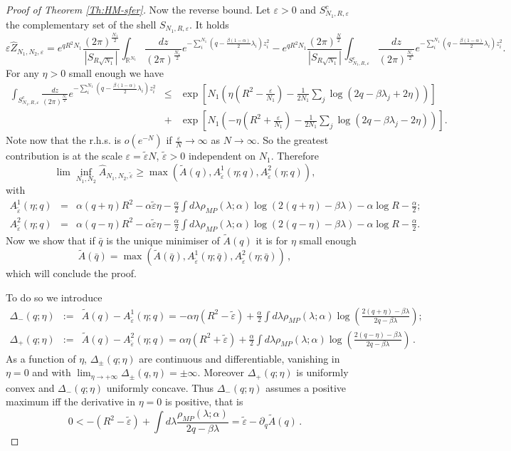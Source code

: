 \documentclass[10pt,oneside,a4paper,reqno]{amsart}  %
\def\be{\begin{equation}}
\def\ee{\end{equation}}
\def\bea{\begin{eqnarray}}
\def\eea{\end{eqnarray}}
\def\ni{\noindent}
\def\nn{\nonumber}
\def\a{\alpha}
\def\e{\varepsilon}
\def\b{\beta}
\def\D{\Delta}
\def\l{\lambda}
\def\r{\rho}
\def\R{\mathbb{R}}
\theoremstyle{plain}
\numberwithin{equation}{section}
\begin{document}
\begin{proof}[Proof of Theorem \ref{Th:HM-sfer}]
\ni Now the reverse bound. Let $\e>0$ and $S^c_{N_1,R,\e}$ the complementary set of the shell $S_{N_1,R,\e}$. It holds
$$
\e \widehat Z_{N_1,N_2,\e}=e^{ q R^2 N_1}\frac{(2\pi)^{\frac {N_1}{2}}}{|S_{R\sqrt{N_1}}|}\int_{\R^{N_1}}\frac{dz}{(2\pi)^{\frac {N_1}{2}}} e^{-\sum_i^{N_1}(q-\frac{\b(1-\a)}{2}\l_i)z_i^2}-e^{ q R^2 N_1}\frac{(2\pi)^{\frac N2}}{|S_{R\sqrt{N_1}}|}\int_{S_{N_1,R,\e}^c}\frac{dz}{(2\pi)^{\frac {N_1}2}} e^{-\sum_i^{N_1}(q-\frac{\b(1-\a)}{2}\l_i)z_i^2}.
$$
For any $\eta>0$ small enough we have
\bea
\int_{S_{N_1,R,\e}^c}\frac{dz}{(2\pi)^{\frac {N_1}2}} e^{-\sum_i^{N_1}(q-\frac{\b(1-\a)}{2}\l_i)z_i^2}&\leq&\exp\left[N_1\left(\eta\left(R^2-\frac\e {N_1}\right)-\frac{1}{2N_1}\sum_j\log(2q-\b\l_j+2\eta)\right)\right]\nn\\
&+&\exp\left[N_1\left(-\eta\left(R^2+\frac\e {N_1}\right)-\frac{1}{2N_1}\sum_j\log(2q-\b\l_j-2\eta)\right)\right]\nn.
\eea
\ni Note now that the r.h.s. is $o(e^{-N})$ if $\frac\e N\to\infty$ as $N\to\infty$. So the greatest contribution is at the scale $\e=\tilde\e N$, $\tilde\e>0$ independent on $N_1$. Therefore
\be\label{eq:max( , , )}
\lim\inf_{N_1,N_2}\widehat A_{N_1,N_2,\tilde\e}\geq\max\left(\tilde A(q), A^1_{\tilde\e}(\eta; q), A^2_{\tilde\e}(\eta; q)\right),
\ee
with
\bea
A^1_{\tilde\e}(\eta; q)&=&\a(q+\eta)R^2-\a\tilde\e\eta-\frac\a2\int d\l\r_{MP}(\l;\a)\log(2(q+\eta)-\b\l)-\a\log R-\frac\a2;\\
A^2_{\tilde\e}(\eta; q)&=&\a(q-\eta)R^2-\a\tilde\e\eta-\frac\a2\int d\l\r_{MP}(\l;\a)\log(2(q-\eta)-\b\l)-\a\log R-\frac\a2.
\eea
Now we show that if $\bar q$ is the unique minimiser of $\tilde A(q)$ it is for $\eta$ small enough
$$
\tilde A(\bar q)=\max\left(\tilde A(\bar q), A^1_{\tilde\e}(\eta; \bar q), A^2_{\tilde\e}(\eta; \bar q)\right)\,,
$$
which will conclude the proof.

To do so we introduce
\bea
\D_-(q;\eta)&:=&\tilde A(q)-A^1_{\tilde\e}(\eta; q)= -\a\eta(R^2-\tilde\e)+\frac\a2\int d\l\r_{MP}(\l;\a)\log\left(\frac{2(q+\eta)-\b\l}{2q-\b\l}\right);\\
\D_+(q;\eta)&:=&\tilde A(q)-A^2_{\tilde\e}(\eta; q)= \a\eta(R^2+\tilde\e)+\frac\a2\int d\l\r_{MP}(\l;\a)\log\left(\frac{2(q-\eta)-\b\l}{2q-\b\l}\right)\,.
\eea
\ni As a function of $\eta$, $\D_\pm(q;\eta)$ are continuous and differentiable, vanishing in $\eta=0$ and with $\lim_{\eta\to+\infty}\D_\pm(q,\eta)=\pm\infty$. Moreover $\D_+(q;\eta)$ is uniformly convex and $\D_-(q;\eta)$ uniformly concave. Thus $\D_-(q;\eta)$ assumes a positive maximum iff the derivative in $\eta=0$ is positive, that is
\be\label{eq:upper-bound-epsi1}
0<-(R^2-\tilde\e)+\int d\l\frac{\r_{MP}(\l;\a)}{2q-\b\l}=\tilde \e-\partial_q \tilde A(q)\,.
\ee


\end{proof}
\end{document}
